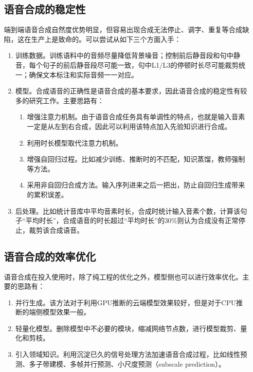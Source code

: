 \documentclass[cn,10pt,math=newtx,citestyle=gb7714-2015,bibstyle=gb7714-2015]{elegantbook}
\begin{document}
\subsection{语音合成的稳定性}

端到端语音合成自然度优势明显，但容易出现合成无法停止、调字、重复等合成缺陷，这在生产上是致命的。可以尝试从如下三个方面入手：

\begin{enumerate}
  \item 训练数据。训练语料中的音频尽量降低背景噪音；控制前后静音段和句中静音，每个句子的前后静音段尽可能一致，句中L1/L3的停顿时长尽可能裁剪统一；确保文本标注和实际音频一一对应。
  \item 模型。合成语音的正确性是语音合成的基本要求，因此语音合成的稳定性有较多的研究工作。主要思路有：
  
  \begin{enumerate}
    \item 增强注意力机制。由于语音合成任务具有单调性的特点，也就是输入音素一定是从左到右合成，因此可以利用该特点加入先验知识进行合成。
    \item 利用时长模型取代注意力机制。
    \item 增强自回归过程。比如减少训练、推断时的不匹配，知识蒸馏，教师强制等方法。
    \item 采用非自回归合成方法。输入序列进来之后一把出，防止自回归生成带来的累积误差。
  \end{enumerate}

  \item 后处理。比如统计音库中平均音素时长，合成时统计输入音素个数，计算该句子“平均时长”，合成语音的时长超过“平均时长”的30\%则认为合成没有正常停止，裁剪该合成语音。
\end{enumerate}

\subsection{语音合成的效率优化}

语音合成在投入使用时，除了纯工程的优化之外，模型侧也可以进行效率优化。主要的思路有：

\begin{enumerate}
  \item 并行生成。该方法对于利用GPU推断的云端模型效果较好，但是对于CPU推断的端侧模型效果一般。
  \item 轻量化模型。删除模型中不必要的模块，缩减网络节点数，进行模型裁剪、量化和剪枝。
  \item 引入领域知识。利用沉淀已久的信号处理方法加速语音合成过程，比如线性预测、多子带建模、多帧并行预测、小尺度预测（subscale prediction）。
\end{enumerate}
\end{document}
